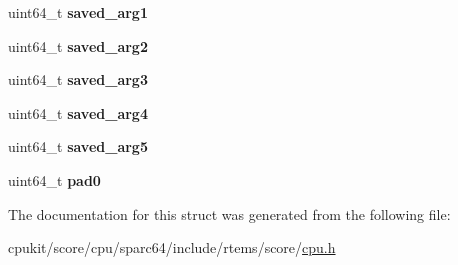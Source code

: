 \begin{DoxyCompactItemize}
uint64\+\_\+t {\bfseries saved\+\_\+arg1}
\item 
\mbox{\label{structSPARC64__Minimum__stack__frame_ab370bfc0682116be128a0ae7744a8802}} 
uint64\+\_\+t {\bfseries saved\+\_\+arg2}
\item 
\mbox{\label{structSPARC64__Minimum__stack__frame_ae8f9c3f1703760f0358e78f65ff2cff9}} 
uint64\+\_\+t {\bfseries saved\+\_\+arg3}
\item 
\mbox{\label{structSPARC64__Minimum__stack__frame_a61ac04e8060d60226a2bcc1d6cb4dabd}} 
uint64\+\_\+t {\bfseries saved\+\_\+arg4}
\item 
\mbox{\label{structSPARC64__Minimum__stack__frame_ad8cd4ce83bc3c5fdbd89fccbf8fdac9d}} 
uint64\+\_\+t {\bfseries saved\+\_\+arg5}
\item 
\mbox{\label{structSPARC64__Minimum__stack__frame_abeee9495db4e4969b191c1c5881c9e2f}} 
uint64\+\_\+t {\bfseries pad0}
\end{DoxyCompactItemize}


The documentation for this struct was generated from the following file\+:\begin{DoxyCompactItemize}
\item 
cpukit/score/cpu/sparc64/include/rtems/score/\mbox{\hyperlink{sparc64_2include_2rtems_2score_2cpu_8h}{cpu.\+h}}\end{DoxyCompactItemize}
